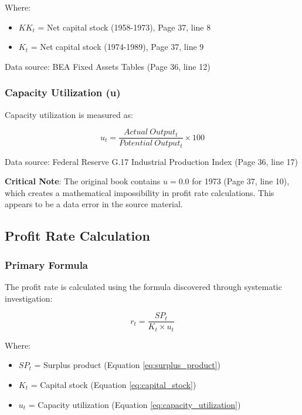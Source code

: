 \documentclass[12pt,a4paper]{article}
\begin{document}
Where:
\begin{itemize}
    \item $KK_t$ = Net capital stock (1958-1973), Page 37, line 8
    \item $K_t$ = Net capital stock (1974-1989), Page 37, line 9
\end{itemize}

Data source: BEA Fixed Assets Tables (Page 36, line 12)

\subsubsection{Capacity Utilization (u)}
Capacity utilization is measured as:

\begin{equation}
u_t = \frac{Actual\ Output_t}{Potential\ Output_t} \times 100
\label{eq:capacity_utilization}
\end{equation}

Data source: Federal Reserve G.17 Industrial Production Index (Page 36, line 17)

\textbf{Critical Note}: The original book contains $u = 0.0$ for 1973 (Page 37, line 10), which creates a mathematical impossibility in profit rate calculations. This appears to be a data error in the source material.

\subsection{Profit Rate Calculation}

\subsubsection{Primary Formula}
The profit rate is calculated using the formula discovered through systematic investigation:

\begin{equation}
r_t = \frac{SP_t}{K_t \times u_t}
\label{eq:profit_rate}
\end{equation}

Where:
\begin{itemize}
    \item $SP_t$ = Surplus product (Equation \ref{eq:surplus_product})
    \item $K_t$ = Capital stock (Equation \ref{eq:capital_stock})
    \item $u_t$ = Capacity utilization (Equation \ref{eq:capacity_utilization})
\end{itemize}
\end{document}

